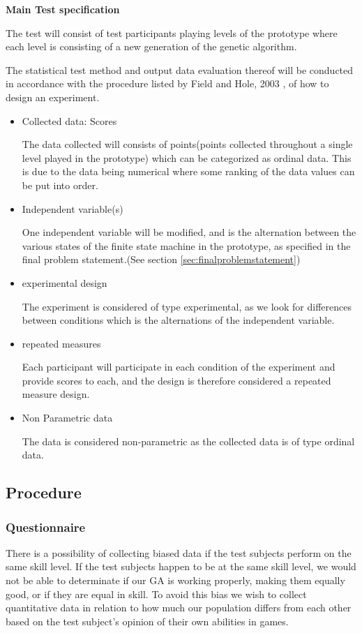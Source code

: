 \newpage
\textbf{Main Test specification}

The test will consist of test participants playing levels of the prototype where each level is consisting of a new generation of the genetic algorithm.

The statistical test method and output data evaluation thereof will be conducted in accordance with the procedure listed by Field and Hole, 2003 \cite[pp. 265-277]{Field2003}, of how to design an experiment.

\begin{itemize}
\item Collected data: Scores

The data collected will consists of points(points collected throughout a single level played in the prototype) which can be categorized as ordinal data. This is due to the data being numerical where some ranking of the data values can be put into order.
\item Independent variable(s)

One independent variable will be modified, and is the alternation between the various states of the finite state machine in the prototype, as specified in the final problem statement.(See section \ref{sec:finalproblemstatement})
\item experimental design

The experiment is considered of type experimental, as we look for differences between conditions which is the alternations of the independent variable.
\item repeated measures

Each participant will participate in each condition of the experiment and provide scores to each, and the design is therefore considered a repeated measure design.
\item Non Parametric data

The data is considered non-parametric as the collected data is of type ordinal data.

\end{itemize}



\subsection{Procedure}

\subsubsection{Questionnaire}
There is a possibility of collecting biased data if the test subjects perform on the same skill level.
If the test subjects happen to be at the same skill level, we would not be able to determinate if our GA is working properly, making them equally good, or if they are equal in skill. To avoid this bias we wish to collect quantitative data in relation to how much our population differs from each other based on the test subject's opinion of their own abilities in games.

